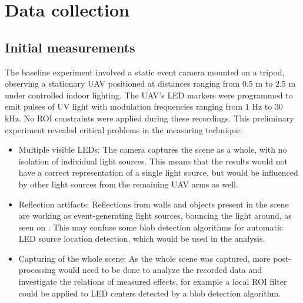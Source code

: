 \section{Data collection}

\subsection{Initial measurements}

The baseline experiment involved a static event camera mounted on a tripod, observing a stationary \ac{UAV} positioned at distances ranging from
$0.5$ m to $2.5$ m under controlled indoor lighting. The \ac{UAV}'s \ac{LED} markers were programmed to emit pulses of \ac{UV} light with modulation
frequencies ranging from $1$ Hz to $30$ kHz. No \ac{ROI} constraints were applied during these recordings.
This preliminary experiment revealed critical problems in the measuring technique:
\begin{itemize}
    \item Multiple visible \ac{LED}s: The camera captures the scene as a whole, with no isolation of individual light sources. This means that the results
    would not have a correct representation of a single light source, but would be influenced by other light sources from the remaining \ac{UAV}
    arms as well.
    \item Reflection artifacts: Reflections from walls and objects present in the scene are working as event-generating light sources, bouncing the light around,
    as seen on .
    This may confuse some blob detection algorithms for automatic \ac{LED} source location detection, which would be used in the analysis.
    \item Capturing of the whole scene: As the whole scene was captured, more post-processing would need to be done to analyze the recorded data and investigate
    the relations of measured effects, for example a local \ac{ROI} filter could be applied to \ac{LED} centers detected by
    a blob detection algorithm.
\end{itemize}



